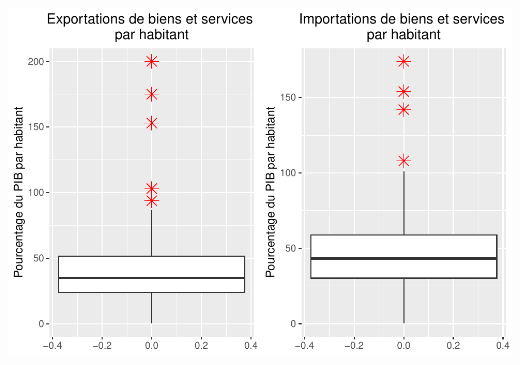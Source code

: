\documentclass[
]{article}
\begin{document}
\includegraphics{projet_apprentissage_non_supp_files/figure-latex/unnamed-chunk-10-1.pdf}
\end{document}
